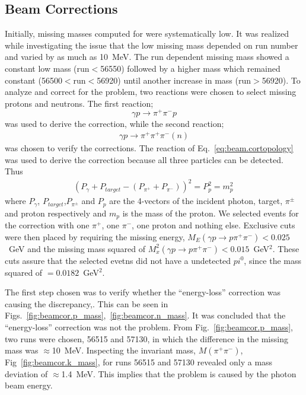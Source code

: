 \subsection{Beam Corrections}\label{sec:analysis.corrections.beam}
Initially, missing masses computed for  were systematically low. It was realized while investigating the issue that the low missing mass depended on run number and varied by as much as 10~MeV. The run dependent missing mass showed a constant low mass (run$<$56550) followed by a higher mass which remained constant (56500$<$run$<$56920) until another increase in mass (run$>$56920). To analyze and correct for the problem, two reactions were chosen to select missing protons and neutrons. The first reaction;
\begin{equation}
\gamma p \rightarrow \pi^+ \pi^- p \label{eq:beam.cortopology}
\end{equation}
was used to derive the correction, while the second reaction;
\begin{align}
\gamma p \rightarrow \pi^+ \pi^+ \pi^- (n)  \label{eq:beam.checktopology}
\end{align}
was chosen to verify the corrections. The reaction of Eq.~\ref{eq:beam.cortopology} was used to derive the correction because all three particles can be detected. Thus
\begin{align}
(P_{\gamma} + P_{target} - (P_{\pi^+} + P_{\pi^-}))^2 = P^2_{p} = m_p^2 \,
\end{align}
where $P_{\gamma}$, $P_{target}$,$P_{\pi^{\pm}}$ and $P_{p}$ are the 4-vectors of the incident photon, target, $\pi^{\pm}$ and proton respectively and $m_p$ is the mass of the proton.
We selected events for the correction with one   $\pi^+$, one   $\pi^-$, one   proton and nothing else. Exclusive cuts were then placed by requiring the missing energy, $M_E(\gamma p \rightarrow p \pi^+ \pi^-) < 0.025$~GeV and the missing mass squared of $M_x^2(\gamma p \rightarrow p \pi^+ \pi^-) < 0.015$~GeV$^2$. These cuts assure that the selected evetns did not have a undetected $pi^0$,
since the mass squared of \piz $= 0.0182$~GeV$^2$.

The first step chosen was to verify whether the ``energy-loss'' correction was causing the discrepancy,. This can be seen in Figs.~\ref{fig:beamcor.p_mass},~\ref{fig:beamcor.n_mass}. It was concluded that the ``energy-loss'' correction was not the problem. From Fig.~\ref{fig:beamcor.p_mass}, two runs were chosen, 56515 and 57130, in which the difference in the missing mass was $\approx$10~MeV. Inspecting the invariant mass, $M(\pi^+\pi^-)$, Fig~\ref{fig:beamcor.k_mass}, for runs 56515 and 57130 revealed only a mass deviation of $\approx$1.4~MeV. This implies that the problem  is caused by the photon beam energy.



